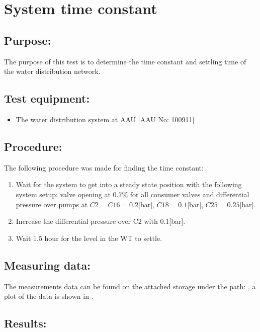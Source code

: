 \section{System time constant}
\label{sec:WT_TimeConstant}

\subsection*{Purpose:}
The purpose of this test is to determine the time constant and settling time of the water distribution network.


\subsection*{Test equipment:}
\begin{itemize}
\item The water distribution system at AAU [AAU No: 100911]
\end{itemize}

\subsection*{Procedure:}
The following procedure was made for finding the time constant:
\begin{enumerate}
\item Wait for the system to get into a steady state position with the following system setup: valve opening at $0.7 \%$ for all consumer valves and differential pressure over pumps at $C2 = C16 = 0.2$[bar], $C18 = 0.1 $[bar], $C25 = 0.25$[bar].
\item Increase the differential pressure over C2 with 0.1[bar].
\item Wait 1.5 hour for the level in the WT to settle.
\end{enumerate}


\subsection*{Measuring data:}
The measurements data can be found on the attached storage under the path: , a plot of the data is shown in .

\subsection*{Results:}

